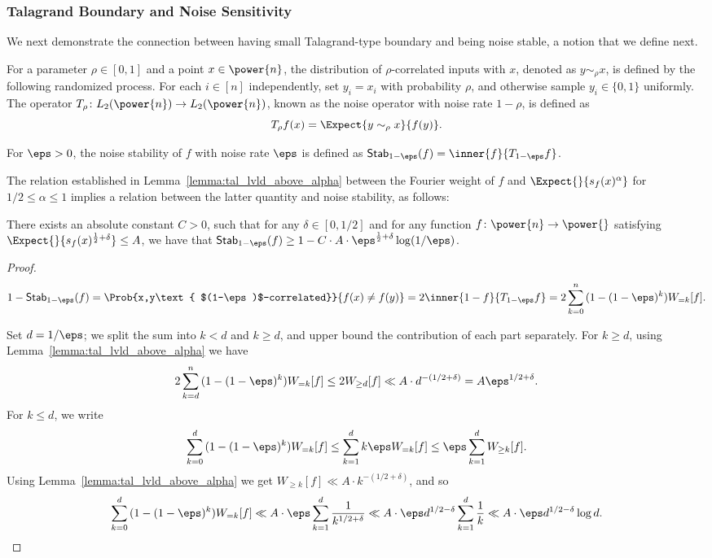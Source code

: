 \subsubsection{Talagrand Boundary and Noise Sensitivity}
We next demonstrate the connection between having small Talagrand-type boundary and being noise stable, a notion that we define next.

For a parameter $\rho\in [0,1]$ and a point $x\in \power{n}$, the distribution of $\rho$-correlated inputs with $x$, denoted as $y\sim_{\rho} x$,
is defined by the following randomized process. For each $i\in[n]$ independently, set $y_i = x_i$ with probability $\rho$, and otherwise sample $y_i\in\{0,1\}$ uniformly.
The operator $T_{\rho}\colon L_2(\power{n}) \to L_2(\power{n})$, known as the noise operator with noise rate
$1-\rho$, is defined as
\[
T_{\rho} f(x) = \Expect{y\sim_{\rho} x}{f(y)}.
\]
\begin{definition}
  For $\eps>0$, the noise stability of $f$ with noise rate $\eps$ is defined as ${\sf Stab}_{1-\eps}(f) = \inner{f}{T_{1-\eps} f}$.
\end{definition}

The relation established in Lemma~\ref{lemma:tal_lvld_above_alpha} between the Fourier weight of $f$ and $\Expect{}{s_f(x)^{\alpha}}$
for $1/2\leq\alpha\leq 1$ implies a relation between the latter quantity and noise stability, as follows:
\begin{corollary}\label{corr:noise_stable}
  There exists an absolute constant $C>0$, such that for any $\delta\in[0,1/2]$ and for any function $f\colon\power{n}\to\power{}$ satisfying
  $\Expect{}{s_f(x)^{\frac{1}{2}+\delta}}\leq A$, we have that ${\sf Stab}_{1-\eps}(f)\geq 1 - C\cdot A\cdot \eps^{\frac{1}{2} + \delta}\log(1/\eps)$.
\end{corollary}
\begin{proof}
  \[
  1-{\sf Stab}_{1-\eps}(f) = \Prob{x,y\text{ $(1-\eps)$-correlated}}{f(x)\neq f(y)}
  =2\inner{1-f}{T_{1-\eps} f}
  =2\sum\limits_{k=0}^n{(1-(1-\eps)^{k})W_{=k}[f]}.
  \]

  Set $d = 1/\eps$; we split the sum into $k< d$ and $k \geq  d$, and upper bound the contribution of each part separately.
  For $k\geq d$, using Lemma~\ref{lemma:tal_lvld_above_alpha} we have
  \[
  2\sum\limits_{k=d}^n{(1-(1-\eps)^{k})W_{=k}[f]}
  \leq 2W_{\geq d}[f]\ll A\cdot d^{-(1/2+\delta)} = A\eps^{1/2+\delta}.
  \]
  For $k\leq d$, we write
  \[
  \sum\limits_{k=0}^d{(1-(1-\eps)^{k})W_{=k}[f]}
  \leq\sum\limits_{k=1}^d{k\eps W_{=k}[f]}
  \leq \eps \sum\limits_{k=1}^{d} W_{\geq k}[f].
  \]
  Using Lemma~\ref{lemma:tal_lvld_above_alpha} we get $W_{\geq k}[f]\ll A\cdot k^{-(1/2+\delta)}$, and so
  \[
  \sum\limits_{k=0}^d{(1-(1-\eps)^{k})W_{=k}[f]}
  \ll A\cdot \eps \sum\limits_{k=1}^{d} \frac{1}{k^{1/2+\delta}}
  \ll A \cdot \eps d^{1/2-\delta} \sum\limits_{k=1}^{d} \frac{1}{k}
  \ll A \cdot \eps d^{1/2-\delta} \log d.
  \qedhere
  \]
\end{proof}
